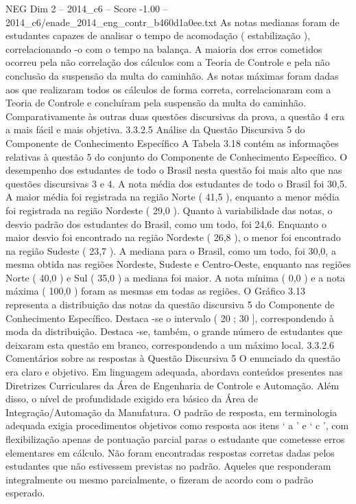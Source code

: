 \begin{textsample}{NEG Dim 2 – 2014\_c6 – Score -1.00 – 2014\_c6/enade\_2014\_eng\_contr\_b460d1a0ee.txt}
As notas medianas foram de estudantes capazes de analisar o tempo de acomodação ( estabilização ), correlacionando -o com o tempo na balança.
A maioria dos erros cometidos ocorreu pela não correlação dos cálculos com a Teoria de Controle e pela não conclusão da suspensão da multa do caminhão.
As notas máximas foram dadas aos que realizaram todos os cálculos de forma correta, correlacionaram com a Teoria de Controle e concluíram pela suspensão da multa do caminhão.
Comparativamente às outras duas questões discursivas da prova, a questão 4 era a mais fácil e mais objetiva. 3.3.2.5 Análise da Questão Discursiva 5 do Componente de Conhecimento Específico A Tabela 3.18 contém as informações relativas à questão 5 do conjunto do Componente de Conhecimento Específico.
O desempenho dos estudantes de todo o Brasil nesta questão foi mais alto que nas questões discursivas 3 e 4.
A nota média dos estudantes de todo o Brasil foi 30,5.
A maior média foi registrada na região Norte ( 41,5 ), enquanto a menor média foi registrada na região Nordeste ( 29,0 ).
Quanto à variabilidade das notas, o desvio padrão dos estudantes do Brasil, como um todo, foi 24,6.
Enquanto o maior desvio foi encontrado na região Nordeste ( 26,8 ), o menor foi encontrado na região Sudeste ( 23,7 ).
A mediana para o Brasil, como um todo, foi 30,0, a mesma obtida nas regiões Nordeste, Sudeste e Centro-Oeste, enquanto nas regiões Norte ( 40,0 ) e Sul ( 35,0 ) a mediana foi maior.
A nota mínima ( 0,0 ) e a nota máxima ( 100,0 ) foram as mesmas em todas as regiões.
O Gráfico 3.13 representa a distribuição das notas da questão discursiva 5 do Componente de Conhecimento Específico.
Destaca -se o intervalo ( 20 ; 30 ], correspondendo à moda da distribuição.
Destaca -se, também, o grande número de estudantes que deixaram esta questão em branco, correspondendo a um máximo local. 3.3.2.6 Comentários sobre as respostas à Questão Discursiva 5 O enunciado da questão era claro e objetivo.
Em linguagem adequada, abordava conteúdos presentes nas Diretrizes Curriculares da Área de Engenharia de Controle e Automação.
Além disso, o nível de profundidade exigido era básico da Área de Integração/Automação da Manufatura.
O padrão de resposta, em terminologia adequada exigia procedimentos objetivos como resposta aos itens ‘ a ’ e ‘ c ’, com flexibilização apenas de pontuação parcial paras o estudante que cometesse erros elementares em cálculo.
Não foram encontradas respostas corretas dadas pelos estudantes que não estivessem previstas no padrão.
Aqueles que responderam integralmente ou mesmo parcialmente, o fizeram de acordo com o padrão esperado.

\end{textsample}
